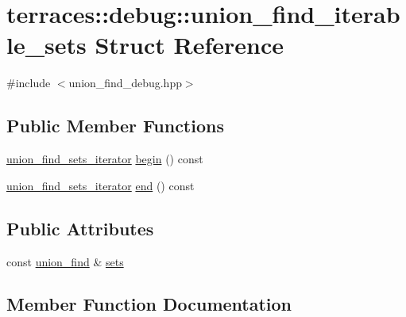 \hypertarget{structterraces_1_1debug_1_1union__find__iterable__sets}{}\section{terraces\+:\+:debug\+:\+:union\+\_\+find\+\_\+iterable\+\_\+sets Struct Reference}
\label{structterraces_1_1debug_1_1union__find__iterable__sets}


{\ttfamily \#include $<$union\+\_\+find\+\_\+debug.\+hpp$>$}

\subsection*{Public Member Functions}
\begin{DoxyCompactItemize}
\item 
\hyperlink{classterraces_1_1debug_1_1union__find__sets__iterator}{union\+\_\+find\+\_\+sets\+\_\+iterator} \hyperlink{structterraces_1_1debug_1_1union__find__iterable__sets_a7fec2315ac93603ba4872ff18aa189b7}{begin} () const
\item 
\hyperlink{classterraces_1_1debug_1_1union__find__sets__iterator}{union\+\_\+find\+\_\+sets\+\_\+iterator} \hyperlink{structterraces_1_1debug_1_1union__find__iterable__sets_a01ca57c0f1b1250077b716c83eabe6a9}{end} () const
\end{DoxyCompactItemize}
\subsection*{Public Attributes}
\begin{DoxyCompactItemize}
\item 
const \hyperlink{classterraces_1_1union__find}{union\+\_\+find} \& \hyperlink{structterraces_1_1debug_1_1union__find__iterable__sets_a4f0fc9e5201089220b2fc8b6fd5445f7}{sets}
\end{DoxyCompactItemize}


\subsection{Member Function Documentation}
\mbox{\label{structterraces_1_1debug_1_1union__find__iterable__sets_a7fec2315ac93603ba4872ff18aa189b7}} 

